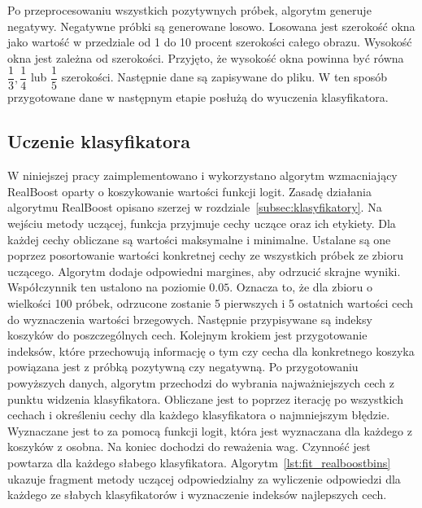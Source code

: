 Po przeprocesowaniu wszystkich pozytywnych próbek, algorytm generuje negatywy.
Negatywne próbki są generowane losowo.
Losowana jest szerokość okna jako wartość w przedziale od 1 do 10 procent szerokości całego obrazu.
Wysokość okna jest zależna od szerokości.
Przyjęto, że wysokość okna powinna być równa $\dfrac{1}{3}, \dfrac{1}{4}$ lub $\dfrac{1}{5}$ szerokości.
Następnie dane są zapisywane do pliku.
W ten sposób przygotowane dane w następnym etapie posłużą do wyuczenia klasyfikatora.

\subsection{Uczenie klasyfikatora}
W niniejszej pracy zaimplementowano i wykorzystano algorytm wzmacniający RealBoost oparty o koszykowanie wartości funkcji logit.
Zasadę działania algorytmu RealBoost opisano szerzej w rozdziale~\ref{subsec:klasyfikatory}.
Na wejściu metody uczącej, funkcja przyjmuje cechy uczące oraz ich etykiety.
Dla każdej cechy obliczane są wartości maksymalne i minimalne.
Ustalane są one poprzez posortowanie wartości konkretnej cechy ze wszystkich próbek ze zbioru uczącego.
Algorytm dodaje odpowiedni margines, aby odrzucić skrajne wyniki.
Współczynnik ten ustalono na poziomie $0.05$.
Oznacza to, że dla zbioru o wielkości 100 próbek, odrzucone zostanie 5 pierwszych i 5 ostatnich wartości cech do wyznaczenia wartości brzegowych.
Następnie przypisywane są indeksy koszyków do poszczególnych cech.
Kolejnym krokiem jest przygotowanie indeksów, które przechowują informację o tym czy cecha dla konkretnego koszyka powiązana jest z próbką pozytywną czy negatywną.
Po przygotowaniu powyższych danych, algorytm przechodzi do wybrania najważniejszych cech z punktu widzenia klasyfikatora.
Obliczane jest to poprzez iterację po wszystkich cechach i określeniu cechy dla każdego klasyfikatora o najmniejszym błędzie.
Wyznaczane jest to za pomocą funkcji logit, która jest wyznaczana dla każdego z koszyków \linebreak z osobna.
Na koniec dochodzi do reważenia wag.
Czynność jest powtarza dla każdego słabego klasyfikatora.
Algorytm~\ref{lst:fit_realboostbins} ukazuje fragment metody uczącej odpowiedzialny za wyliczenie odpowiedzi dla każdego ze słabych klasyfikatorów i wyznaczenie indeksów najlepszych cech.\\\\\\\\\\
